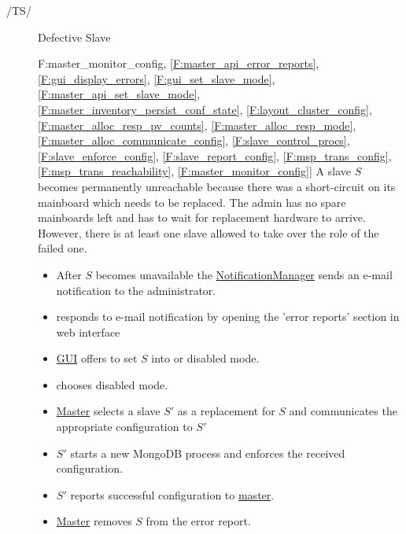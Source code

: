 \documentclass[a4paper, 11pt]{article}
\makeatletter
\def\namedlabel#1#2{\begingroup
    #2%
    \def\@currentlabel{#2}%
    \phantomsection\label{#1}\endgroup
}
\newcommand{\oitem}[2]{
  \@ifundefined{c@oitem#1}{\newcounter{oitem#1}}{} %
  \addtocounter{oitem#1}{10}
  \item[\namedlabel{#1:#2}{/#1\arabic{oitem#1}/}]
}
\newcommand{\testsequence}[3][]{
	\begin{description}[leftmargin=!,labelwidth=\widthof{\bfseries Preconditions}]
		\ifthenelse{\equal{#1}{}}
		{} %
		{\item[Tests] #1}
		\item[Preconditions] #2
		\item[Steps] #3
	\end{description}
}
\makeatother
\begin{document}
\begin{description}
\oitem{TS}{} Defective Slave
\testsequence
[\ref{F:master_monitor_config}, \ref{F:master_api_error_reports}, \ref{F:gui_display_errors}, \ref{F:gui_set_slave_mode}, \ref{F:master_api_set_slave_mode}, \ref{F:master_inventory_persist_conf_state}, \ref{F:layout_cluster_config}, \ref{F:master_alloc_resp_pv_counts}, \ref{F:master_alloc_resp_mode}, \ref{F:master_alloc_communicate_config}, \ref{F:slave_control_procs}, \ref{F:slave_enforce_config}, \ref{F:slave_report_config}, \ref{F:msp_trans_config}, \ref{F:msp_trans_reachability}, \ref{F:master_monitor_config}]
{
	A \gls{slave} $S$ becomes permanently unreachable because there was a short-circuit on its mainboard which needs to be replaced. The admin has no spare mainboards left and has to wait for replacement hardware to arrive. However, there is at least one  \gls{slave} allowed to take over the role of the failed one.
}
{
	\begin{itemize}
		\item After $S$ becomes unavailable the \hyperref[SM:NotificationManager]{NotificationManager} sends an e-mail notification to the \gls{administrator}.
		\item {} responds to e-mail notification by opening the 'error reports' section in web interface %
		\item \hyperref[SM:GUI]{GUI} offers to set $S$ into  or \gls{disabled mode}.
		\item {} chooses \gls{disabled mode}.
		\item \hyperref[SM:Master]{Master} selects a \gls{slave} $S'$ as a replacement for $S$ and communicates the appropriate configuration to $S'$
		\item $S'$ starts a new \gls{MongoDB} process and enforces the received configuration.
		\item $S'$ reports successful configuration to \hyperref[SM:Master]{master}.
		\item \hyperref[SM:Master]{Master} removes $S$ from the error report.
	\end{itemize}
}



\end{description}
\end{document}
